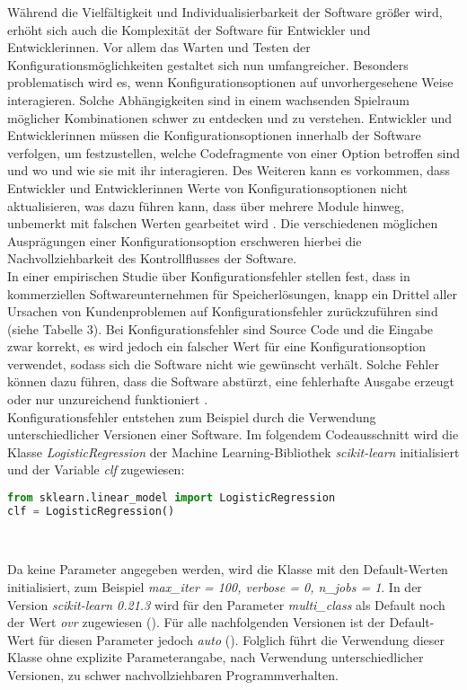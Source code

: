 \documentclass[german,bachelor]{swsLeipzig}
\begin{document}
W\"ahrend die Vielf\"altigkeit und Individualisierbarkeit der Software gr\"o\ss er wird, erh\"oht sich auch die Komplexit\"at der Software f\"ur Entwickler und Entwicklerinnen.
Vor allem das Warten und Testen der Konfigurationsmöglichkeiten gestaltet sich nun umfangreicher.
Besonders problematisch wird es, wenn Konfigurationsoptionen auf unvorhergesehene Weise interagieren.
Solche Abh\"angigkeiten sind in einem wachsenden Spielraum m\"oglicher Kombinationen schwer zu entdecken und zu verstehen.
Entwickler und Entwicklerinnen m\"ussen die Konfigurationsoptionen innerhalb der Software verfolgen, um festzustellen,
welche Codefragmente von einer Option betroffen sind und wo und wie sie mit ihr interagieren.
Des Weiteren kann es vorkommen, dass Entwickler und Entwicklerinnen Werte von Konfigurationsoptionen nicht aktualisieren, was dazu führen kann,
dass über mehrere Module hinweg, unbemerkt mit falschen Werten gearbeitet wird \cite[]{7774519}.
Die verschiedenen m\"oglichen Auspr\"agungen einer Konfigurationsoption erschweren hierbei die Nachvollziehbarkeit des Kontrollflusses der Software.\\

In einer empirischen Studie über Konfigurationsfehler stellen \citeauthor{10.1145/2043556.2043572} fest,
dass in kommerziellen Softwareunternehmen für Speicherlösungen, knapp ein Drittel aller Ursachen von Kundenproblemen auf Konfigurationsfehler zurückzuführen sind (siehe Tabelle 3).
Bei Konfigurationsfehler sind Source Code und die Eingabe zwar korrekt, es wird jedoch ein falscher Wert für eine Konfigurationsoption verwendet,
sodass sich die Software nicht wie gewünscht verhält.
Solche Fehler können dazu führen, dass die Software abstürzt, eine fehlerhafte Ausgabe erzeugt oder nur unzureichend funktioniert \cite[]{10.1145/2568225.2568251}.\\

Konfigurationsfehler entstehen zum Beispiel durch die Verwendung unterschiedlicher Versionen einer Software.
Im folgendem Codeausschnitt wird die Klasse \textit{LogisticRegression} der Machine Learning-Bibliothek \textit{scikit-learn} initialisiert und der Variable \textit{clf} zugewiesen:\\

\begin{lstlisting}[language=Python, frame=single, basicstyle=\small]
from sklearn.linear_model import LogisticRegression
clf = LogisticRegression()
\end{lstlisting}
\

Da keine Parameter angegeben werden, wird die Klasse mit den Default-Werten initialisiert, zum Beispiel
\textit{max\_iter = 100, verbose = 0, n\_jobs = 1}.
In der Version \textit{scikit-learn 0.21.3} wird für den Parameter \textit{multi\_class} als Default noch der Wert \textit{ovr} zugewiesen (\citeyear{sklearn}).
Für alle nachfolgenden Versionen ist der Default-Wert für diesen Parameter jedoch \textit{auto} (\citeyear{sklearn}).
Folglich führt die Verwendung dieser Klasse ohne explizite Parameterangabe, nach Verwendung unterschiedlicher Versionen, zu schwer nachvollziehbaren Programmverhalten.\\
\end{document}

